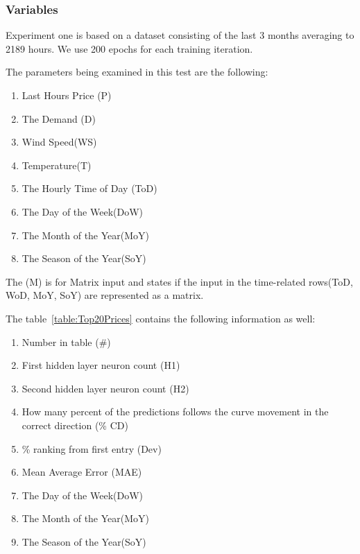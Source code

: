 \subsubsection{Variables}
Experiment one is based on a dataset consisting of the last 3 months averaging to 2189 hours. We use 200 epochs for each training iteration.

The parameters being examined in this test are the following:
\begin{enumerate}
	\item Last Hours Price (P)
	\item The Demand (D)
	\item Wind Speed(WS)
	\item Temperature(T)
	\item The Hourly Time of Day (ToD)
	\item The Day of the Week(DoW)
	\item The Month of the Year(MoY)
	\item The Season of the Year(SoY)
\end{enumerate}

The (M) is for Matrix input and states if the input in the time-related rows(ToD, WoD, MoY, SoY) are represented as a matrix.

The table~\ref{table:Top20Prices} contains the following information as well:
\begin{enumerate}
	\item Number in table (\#)
	\item First hidden layer neuron count (H1)
	\item Second hidden layer neuron count (H2)
	\item How many percent of the predictions follows the curve movement in the correct direction (\% CD)
	\item \% ranking from first entry (Dev)
	\item Mean Average Error (MAE)
	\item The Day of the Week(DoW)
	\item The Month of the Year(MoY)
	\item The Season of the Year(SoY)
\end{enumerate}

